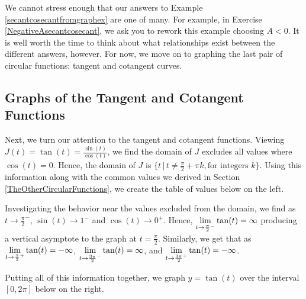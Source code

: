 \documentclass{ximera}
\begin{document}
We cannot stress enough that our answers to Example \ref{secantcosecantfromgraphex} are one of many.  For example, in Exercise \ref{NegativeAsecantcosecant}, we ask you to rework this example choosing $A<0$.  It is well worth the time to think about what relationships exist between the different answers, however.  For now, we move on to graphing the last pair of circular functions: tangent and cotangent curves.


\subsection{Graphs of the Tangent and Cotangent Functions}

Next, we turn our attention to the tangent and cotangent functions.  Viewing $J(t) = \tan(t) = \frac{\sin(t)}{\cos(t)}$, we find the domain of $J$ excludes all values where $\cos(t) = 0$.  Hence, the domain of $J$ is $\{ t \, | \, t \neq  \frac{\pi}{2} + \pi k, \text{for integers $k$} \}$.  Using this information along with the common values we derived in Section \ref{TheOtherCircularFunctions}, we create the table of values below on the left.

\smallskip

Investigating the behavior near the values excluded from the domain, we find as $t \rightarrow \frac{\pi}{2}^{-}$, $\sin(t) \rightarrow 1^{-}$ and $\cos(t) \rightarrow 0^{+}$. Hence,   $\ds{\lim_{t \rightarrow \frac{\pi}{2}^{-}}\tan(t) = \infty}$ producing a vertical asymptote to the graph at $t = \frac{\pi}{2}$.  Similarly, we get that as $\ds{\lim_{t \rightarrow \frac{\pi}{2}^{+}} \tan(t) = -\infty}$,   $\ds{\lim_{t \rightarrow \frac{3\pi}{2}^{-}} \tan(t) = \infty}$, and  $\ds{\lim_{t \rightarrow \frac{3\pi}{2}^{+}}\tan(t) = -\infty}$.

\smallskip

Putting all of this information together, we graph $y = \tan(t)$ over the interval $[0, 2\pi]$ below on the right.

\smallskip
\end{document}

